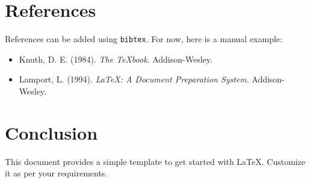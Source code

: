 \documentclass[a4paper, 12pt]{article}
\begin{document}
\section{References}
References can be added using \texttt{bibtex}. For now, here is a manual example:
\begin{itemize}
    \item Knuth, D. E. (1984). \textit{The TeXbook}. Addison-Wesley.
    \item Lamport, L. (1994). \textit{\LaTeX: A Document Preparation System}. Addison-Wesley.
\end{itemize}

\section{Conclusion}
This document provides a simple template to get started with \LaTeX. Customize it as per your requirements.
\end{document}
